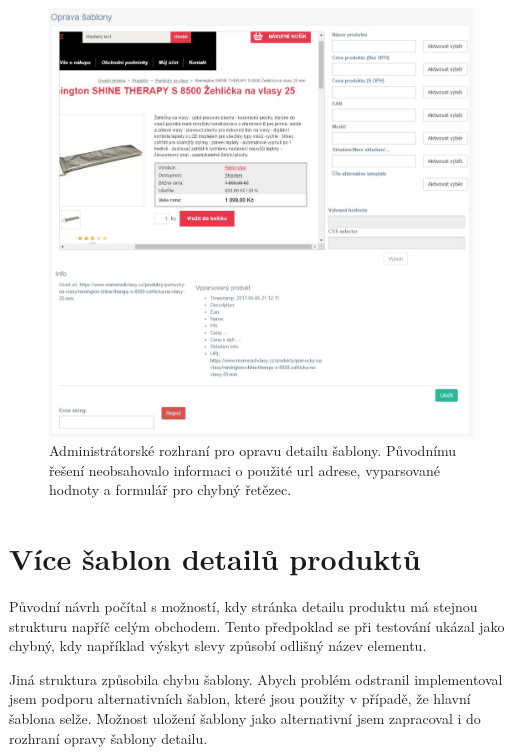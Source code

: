 \documentclass[thesis=B,czech]{FITthesis}[2012/06/26]
\begin{document}
\begin{figure}\centering
 	\includegraphics[width=1.0\textwidth]{resources/template-detail-err}
	\caption[Administrátorské rozhraní pro opravu detailu šablony]{Administrátorské rozhraní pro opravu detailu šablony.
	Původnímu řešení neobsahovalo informaci o použité url adrese, vyparsované hodnoty a formulář pro chybný řetězec.}\label{fig:temp-det-err}
\end{figure}

\section{Více šablon detailů produktů}
Původní návrh počítal s možností, kdy stránka detailu produktu má stejnou strukturu napříč celým obchodem.
Tento předpoklad se při testování ukázal jako chybný, kdy například výskyt slevy způsobí odlišný název elementu.
\par
Jiná struktura způsobila chybu šablony. Abych problém odstranil implementoval jsem podporu alternativních šablon, které jsou
použity v případě, že hlavní šablona selže. Možnost uložení šablony jako alternativní jsem zapracoval i do rozhraní opravy šablony detailu.
\end{document}
